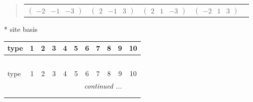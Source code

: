 \documentclass[fleqn,9pt,landscape]{jsarticle}
\begin{document}
\begin{quote}
\begin{tabular}{ccccc}
$ \begin{pmatrix} -2 & -1 & -3 \end{pmatrix} $ & $ \begin{pmatrix} 2 & -1 & 3 \end{pmatrix} $ & $ \begin{pmatrix} 2 & 1 & -3 \end{pmatrix} $ & $ \begin{pmatrix} -2 & 1 & 3 \end{pmatrix} $ & $  $
\end{tabular}
\end{quote}
* site basis
\begin{center}
\renewcommand{\arraystretch}{1.3}
\begin{longtable}{lcccccccccc}
 \hline \hline
type & 1 & 2 & 3 & 4 & 5 & 6 & 7 & 8 & 9 & 10 \\ \hline \endfirsthead

\multicolumn{10}{l}{\tablename\ \thetable{}} \\
 \hline \hline
type & 1 & 2 & 3 & 4 & 5 & 6 & 7 & 8 & 9 & 10 \\ \hline \endhead

 \hline \hline
\multicolumn{10}{r}{\footnotesize\it continued ...} \\ \endfoot

 \hline \hline
\multicolumn{10}{r}{} \\ \endlastfoot


\end{longtable}
\end{center}
\end{document}
